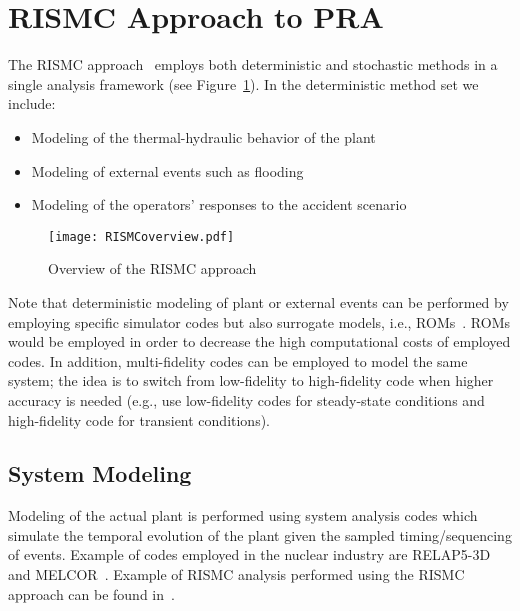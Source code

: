 \section{RISMC Approach to PRA}
\label{sec:rismc}
The RISMC approach~\cite{RISMC} employs both deterministic and stochastic methods 
in a single analysis framework (see Figure~\ref{fig:RISMCoverview}). In the deterministic method 
set we include:
\begin{itemize}
  \item Modeling of the thermal-hydraulic behavior of the plant~\cite{BWR_SBO_Mandelli,BWRanalysis}
  \item Modeling of external events such as flooding~\cite{mandelliPSA2015}
  \item Modeling of the operators’ responses to the accident scenario~\cite{HRA_BoringReport2014}
\end{itemize}

\begin{figure}
    \centering
    \centerline{\texttt{[image: RISMCoverview.pdf]}}
    \caption{Overview of the RISMC approach}
    \label{fig:RISMCoverview}
\end{figure}

Note that deterministic modeling of plant or external events can be performed by employing 
specific simulator codes but also surrogate models, i.e., ROMs~\cite{ROM_Khalik}. 
ROMs would be employed in order to decrease the high computational costs of employed codes.
In addition, multi-fidelity codes can be employed to model the same system; the idea is to 
switch from low-fidelity to high-fidelity code when higher accuracy is needed (e.g., use 
low-fidelity codes for steady-state conditions and high-fidelity code for transient conditions).

\subsection{System Modeling}

Modeling of the actual plant is performed using system analysis codes which simulate the temporal 
evolution of the plant given the sampled timing/sequencing of events. Example of codes employed 
in the nuclear industry are RELAP5-3D~\cite{relap5} and MELCOR~\cite{Melcor}. 
Example of RISMC analysis performed using the RISMC approach can be 
found in~\cite{BWR_SBO_Mandelli,BWRanalysis,PRA_comparison_PSA2015}.

